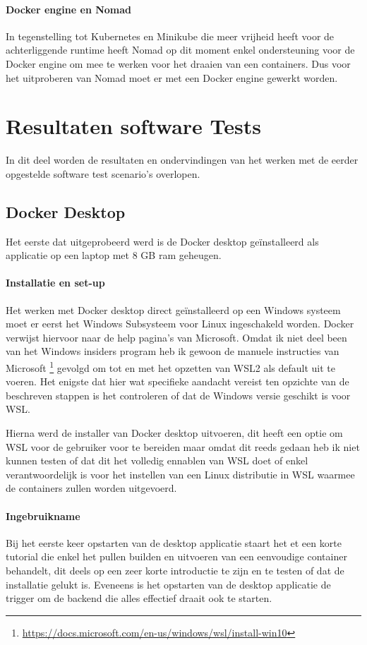 \paragraph{Docker engine en Nomad}
In tegenstelling tot Kubernetes en Minikube die meer vrijheid heeft voor de achterliggende runtime heeft Nomad op dit moment enkel ondersteuning voor de Docker engine om mee te werken voor het draaien van een containers. Dus voor het uitproberen van Nomad moet er met een Docker engine gewerkt worden.

\section{Resultaten software Tests}
In dit deel worden de resultaten en ondervindingen van het werken met de eerder opgestelde software test scenario’s overlopen. 

\subsection{Docker Desktop}
Het eerste dat uitgeprobeerd werd is de Docker desktop geïnstalleerd als applicatie op een laptop met 8 GB ram geheugen.

\paragraph{Installatie en set-up}
Het werken met Docker desktop direct geïnstalleerd op een Windows systeem moet er eerst het Windows Subsysteem voor Linux ingeschakeld worden. Docker verwijst hiervoor naar de help pagina’s van Microsoft. Omdat ik niet deel been van het Windows insiders program heb ik gewoon de manuele instructies van Microsoft \footnote{\url{https://docs.microsoft.com/en-us/windows/wsl/install-win10}} gevolgd om tot en met het opzetten van WSL2 als default uit te voeren. Het enigste dat hier wat specifieke aandacht vereist ten opzichte van de beschreven stappen is het controleren of dat de Windows versie geschikt is voor WSL.

Hierna werd de installer van Docker desktop uitvoeren, dit heeft een optie om WSL voor de gebruiker voor te bereiden maar omdat dit reeds gedaan heb ik niet kunnen testen of dat dit het volledig ennablen van WSL doet of enkel verantwoordelijk is voor het instellen van een Linux distributie in WSL waarmee de containers zullen worden uitgevoerd.

\paragraph{Ingebruikname}
Bij het eerste keer opstarten van de desktop applicatie staart het et een korte tutorial die enkel het pullen builden en uitvoeren van een eenvoudige container behandelt,  dit deels op een zeer korte introductie te zijn en te testen of dat de installatie gelukt is. Eveneens is het opstarten van de desktop applicatie de trigger om de backend die alles effectief draait ook te starten.

